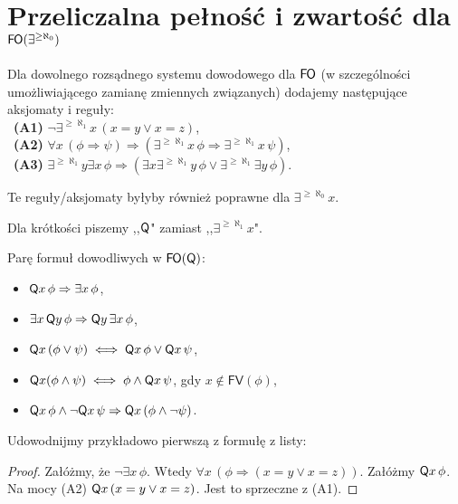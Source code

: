 \documentclass{article}
\begin{document}
\section{Przeliczalna pełność i zwartość dla $\mathsf{F \mkern-1.4mu O}(\exists^{\geq \aleph_0})$}

\begin{df}
	 Dla dowolnego rozsądnego systemu dowodowego dla $\mathsf{F \mkern-1.4mu O}$ (w szczególności umożliwiającego zamianę zmiennych związanych)
	 dodajemy następujące aksjomaty i reguły:
	 \\\mbox{  }\textbf{(A1)} $\neg \exists^{\geq \aleph_1} x \, (x = y \vee x = z)$,
	 \\\mbox{  }\textbf{(A2)} $\forall x \,(\phi \Rightarrow \psi) \Rightarrow (\exists^{\geq \aleph_1} x \, \phi \Rightarrow \exists^{\geq \aleph_1} x \, \psi)$,
	 \\\mbox{  }\textbf{(A3)} $\exists^{\geq \aleph_1} y \exists x \, \phi \Rightarrow (\exists x \exists^{\geq \aleph_1} y \, \phi \vee \exists^{\geq \aleph_1} \exists y \, \phi)$.

\end{df}

\begin{uw}
	Te reguły/aksjomaty byłyby również poprawne dla $\exists^{\geq \aleph_0} x$.
\end{uw}

\begin{ozn}
	Dla krótkości piszemy ,,$\mathsf{Q}$" zamiast ,,$\exists^{\geq \aleph_1} x$".
\end{ozn}

\begin{prz}
	Parę formuł dowodliwych w $\mathsf{F \mkern-1.4mu O}(\mathsf{Q})$:
	\begin{itemize}
		\item $\mathsf{Q} x \, \phi \Rightarrow \exists x \, \phi$,
		\item $\exists x \,\mathsf{Q} y \, \phi \Rightarrow \mathsf{Q} y \, \exists x \, \phi$,
		\item $\mathsf{Q} x \, (\phi \vee \psi) \iff \mathsf{Q} x \, \phi \vee \mathsf{Q} x \, \psi$,
		\item $\mathsf{Q} x (\phi \wedge \psi) \iff \phi \wedge \mathsf{Q} x \, \psi$, gdy $x \not \in \mathsf{FV}(\phi)$,
		\item $\mathsf{Q} x \, \phi \wedge \neg \mathsf{Q} x \, \psi \Rightarrow \mathsf{Q} x \, (\phi \wedge \neg \psi)$.
	\end{itemize}
\end{prz}
Udowodnijmy przykładowo pierwszą z formułę z listy:
\begin{proof}
	 Załóżmy, że $\neg \exists x \, \phi$.
	 Wtedy $\forall x \, (\phi \Rightarrow (x = y \vee x = z))$.
	 Załóżmy $\mathsf{Q} x \, \phi$.
	 Na mocy (A2) $\mathsf{Q} x \, (x = y \vee x = z)$.
	 Jest to sprzeczne z (A1).
\end{proof}
\end{document}
